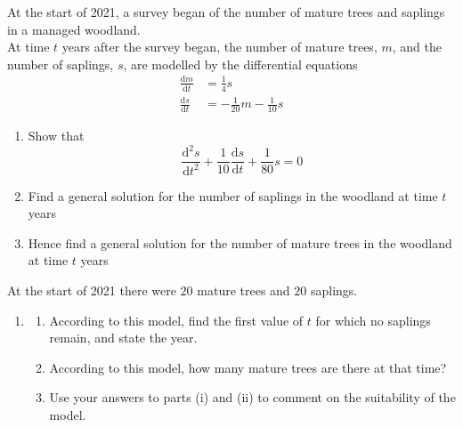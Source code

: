 \documentclass[leqno]{article}
\begin{document}
\begin{enumerate}[
  label=\textbf{\arabic*.},
  leftmargin=*,
  topsep=0pt,
  partopsep=0pt,
  parsep=0pt
]
At the start of 2021, a survey began of the number of mature trees and saplings in a managed woodland. \\

At time $t$ years after the survey began, the number of mature trees, $m$, and the number of saplings, $s$, are modelled by the differential equations \\
\begin{align*}
\frac{\mathrm{d}m}{\mathrm{d}t}&=\frac{1}{4}s \\[5pt]
\frac{\mathrm{d}s}{\mathrm{d}t}&=-\frac{1}{20}m-\frac{1}{10}s
\end{align*}

\begin{enumerate}[label=\textbf{(\alph*)}]
  \item Show that
  \[\frac{\mathrm{d}^2 s}{\mathrm{d}t^2}+\frac{1}{10}\frac{\mathrm{d}s}{\mathrm{d}t}+\frac{1}{80}s=0\]
  \item Find a general solution for the number of saplings in the woodland at time $t$ years  \\
  \item Hence find a general solution for the number of mature trees in the woodland at time $t$ years  \\
\end{enumerate}
At the start of 2021 there were $20$ mature trees and $20$ saplings. \\
\begin{enumerate}[label=\textbf{(\alph*)}, resume]
  \item \begin{enumerate}[label=(\roman*)]
    \item According to this model, find the first value of $t$ for which no saplings remain, and state the year.
    \item According to this model, how many mature trees are there at that time?
    \item Use your answers to parts (i) and (ii) to comment on the suitability of the model.
  \end{enumerate}
\end{enumerate}

\newpage

\questionitem

\begin{figure}[H]
    \centering
{}
\end{figure}
\end{enumerate}
\end{document}
